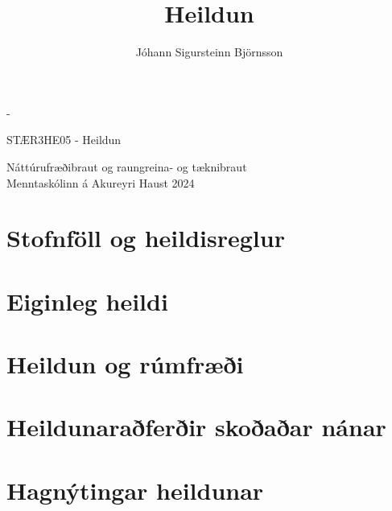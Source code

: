 \documentclass[12pt, a4paper]{article}
\title{Heildun} %
\author{Jóhann Sigursteinn Björnsson}
\date{}
\begin{document}
\mbox{}

\vfill

\mbox{}

\begin{adjustwidth}{-\hanging}{}
\thispagestyle{empty}
\begin{center}
\Huge{STÆR3HE05 - Heildun}

\LARGE{Náttúrufræðibraut og raungreina- og tæknibraut}\\[3ex]

\Large{Menntaskólinn á Akureyri Haust 2024}

\vfill

\end{center}
\end{adjustwidth}
\mbox{}

\vfill\vfill

\newpage


\newcommand{\kafli}{1} %
\newcommand{\svor}{1} %
\newcommand{\lausnir}{0} %


\section{Stofnföll og heildisreglur}
\setcounter{regluteljari}{1}
\setcounter{skilgrteljari}{1}
\setcounter{subsection}{1}



\newpage

\section{Eiginleg heildi}
\setcounter{regluteljari}{1}
\setcounter{skilgrteljari}{1}


\newpage

\section{Heildun og rúmfræði}

\section{Heildunaraðferðir skoðaðar nánar}

\section{Hagnýtingar heildunar}
\setcounter{regluteljari}{1}
\end{document}
